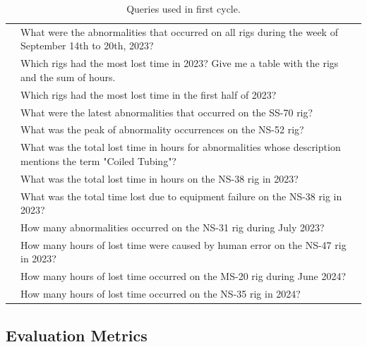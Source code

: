 \begin{table}[h]
\begin{tabular}{|p{.1\linewidth}|p{.9\linewidth}|}
                & What were the abnormalities that occurred on all rigs during the week of September 14th to 20th, 2023? \\ \cline{2-2}
                & Which rigs had the most lost time in 2023? Give me a table with the rigs and the sum of hours. \\ \cline{2-2}
                & Which rigs had the most lost time in the first half of 2023? \\ \cline{2-2}
                & What were the latest abnormalities that occurred on the SS-70 rig? \\ \cline{2-2}
                & What was the peak of abnormality occurrences on the NS-52 rig? \\ \cline{2-2}
                & What was the total lost time in hours for abnormalities whose description mentions the term "Coiled Tubing"? \\ \cline{2-2}
                & What was the total lost time in hours on the NS-38 rig in 2023? \\ \cline{2-2}
                & What was the total time lost due to equipment failure on the NS-38 rig in 2023? \\ \cline{2-2}
                & How many abnormalities occurred on the NS-31 rig during July 2023? \\ \cline{2-2}
                & How many hours of lost time were caused by human error on the NS-47 rig in 2023? \\ \cline{2-2}
                & How many hours of lost time occurred on the MS-20 rig during June 2024? \\ \cline{2-2}
                & How many hours of lost time occurred on the NS-35 rig in 2024? \\
                \hline
                \end{tabular}
                \fussy
                \caption{Queries used in first cycle. }
                \label{table:question_examples}
            \end{table}

        \subsection{Evaluation Metrics} \label{sec:evaluation_metrics}

